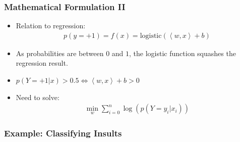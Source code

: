 \begin{frame}
    \frametitle{Mathematical Formulation II}
    \begin{itemize}
        \item Relation to regression:
            \begin{align}
                p(y=+1) = f(x) = \text{logistic}(\left<w, x\right> + b)
            \end{align}
        \item As probabilities are between $0$ and $1$, the logistic function
            squashes the regression result.
        \item $p(Y=+1 | x) > 0.5 \Leftrightarrow \left <w, x \right> + b > 0$
        \item Need to solve:
            \begin{align}
                \min_w \sum_{i=0}^n \log(p(Y=y_i | x_i))
            \end{align}
    \end{itemize}
\end{frame}


\begin{frame}
    \frametitle{Example: Classifying Insults}
\end{frame}

